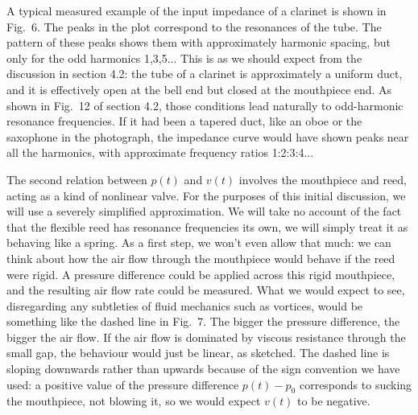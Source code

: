   A typical measured example of the input impedance of a clarinet is shown in 
  Fig.\ 6. The peaks in the plot correspond to the resonances of the tube. The 
  pattern of these peaks shows them with approximately harmonic spacing, but 
  only for the odd harmonics 1,3,5... This is as we should expect from the 
  discussion in section 4.2: the tube of a clarinet is approximately a uniform 
  duct, and it is effectively open at the bell end but closed at the mouthpiece 
  end. As shown in Fig.\ 12 of section 4.2, those conditions lead naturally to 
  odd-harmonic resonance frequencies. If it had been a tapered duct, like an 
  oboe or the saxophone in the photograph, the impedance curve would have shown 
  peaks near all the harmonics, with approximate frequency ratios 1:2:3:4... 


  The second relation between $p(t)$ and $v(t)$ involves the mouthpiece and 
  reed, acting as a kind of nonlinear valve. For the purposes of this initial 
  discussion, we will use a severely simplified approximation. We will take no 
  account of the fact that the flexible reed has resonance frequencies its own, 
  we will simply treat it as behaving like a spring. As a first step, we won’t 
  even allow that much: we can think about how the air flow through the 
  mouthpiece would behave if the reed were rigid. A pressure difference could 
  be applied across this rigid mouthpiece, and the resulting air flow rate 
  could be measured. What we would expect to see, disregarding any subtleties 
  of fluid mechanics such as vortices, would be something like the dashed line 
  in Fig.\ 7. The bigger the pressure difference, the bigger the air flow. If 
  the air flow is dominated by viscous resistance through the small gap, the 
  behaviour would just be linear, as sketched. The dashed line is sloping 
  downwards rather than upwards because of the sign convention we have used: a 
  positive value of the pressure difference $p(t)-p_0$ corresponds to sucking 
  the mouthpiece, not blowing it, so we would expect $v(t)$ to be negative. 


